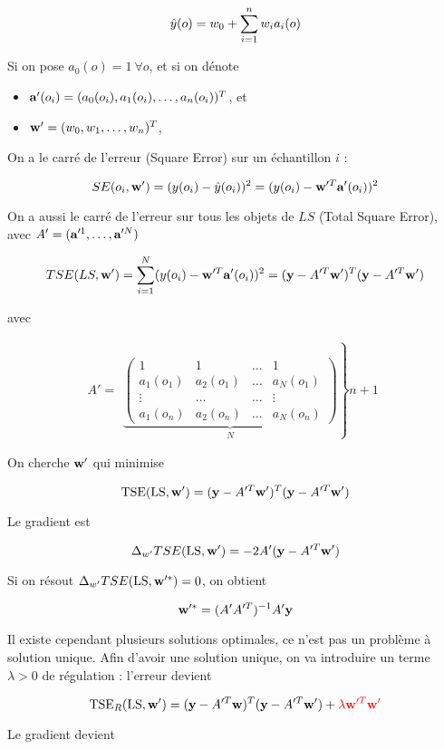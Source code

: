 	$$\hat{y}(o) = w_0 + \sum_{i = 1}^n w_i a_i(o)$$
	
	Si on pose $a_0(o) = 1 \: \forall o$, et si on dénote
	
	\begin{itemize}
		\item $\textbf{a}'(o_i) = (a_0(o_i), a_1(o_i), \dots , a_n(o_i))^T$, et
		\item $\textbf{w}' = (w_0, w_1, \dots , w_n)^T$,
	\end{itemize}
	
	On a le carré de l'erreur (Square Error) sur un échantillon $i$ :
	
	$$SE(o_i, \textbf{w}') = (y(o_i) - \hat{y}(o_i))^2 = (y(o_i) - \textbf{w}'^T\textbf{a}'(o_i))^2$$
	
	On a aussi le carré de l'erreur sur tous les objets de $LS$ (Total Square Error), avec $A' = (\textbf{a}'^1, \dots , \textbf{a}'^N)$
	
	$$TSE(LS, \textbf{w}') = \sum_{i = 1}^N (y(o_i) - \textbf{w}'^T\textbf{a}'(o_i))^2 = (\textbf{y} - A'^T\textbf{w}')^T(\textbf{y} - A'^T\textbf{w}')$$
	
	avec
	
	$$A' = \begin{array}{c}\left. \underbrace{\begin{pmatrix}
	1 & 1 & \dots & 1 \\ 
	a_1(o_1) & a_2(o_1) & \dots & a_N(o_1) \\ 
	\vdots & \dots & \dots & \vdots \\ 
	a_1(o_n) & a_2(o_n) & \dots & a_N(o_n)
	\end{pmatrix}}_{N}\right\} n + 1\end{array} $$
	
		
	On cherche $\textbf{w}'$ qui minimise
		
	$$\text{TSE}(\text{LS}, \textbf{w}') = (\textbf{y} - A'^T\textbf{w}')^T(\textbf{y} - A'^T\textbf{w}')$$
		
	Le gradient est
		
	$$\Delta_{w'} TSE(\text{LS}, \textbf{w}') = -2 A' (\textbf{y} - A'^T\textbf{w}')$$
		
	Si on résout $\Delta_{w'} TSE(\text{LS}, \textbf{w}'^*) = 0$, on obtient
		
	$$\textbf{w}'^* = (A'A'^T)^{-1}A'\textbf{y}$$
		
	Il existe cependant plusieurs solutions optimales, ce n'est pas un problème à solution unique. Afin d'avoir une solution unique, on va introduire un terme $\lambda > 0$ de régulation : l'erreur devient
	
	$$\text{TSE}_R(\text{LS}, \textbf{w}') = (\textbf{y} - A'^T\textbf{w})^T(\textbf{y} - A'^T\textbf{w}') + \textcolor{red}{\lambda \textbf{w}'^T\textbf{w}'}$$
	
	Le gradient devient
	
